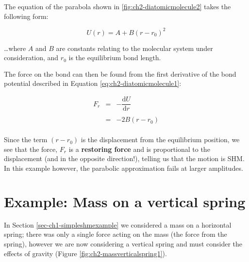 \documentclass[
]{book}
\begin{document}
The equation of the parabola shown in \ref{fig:ch2-diatomicmolecule2} takes the following form:

\begin{equation}
U(r) = A + B(r - r_0)^2
\label{eq:ch2-diatomicmolecule1}
\end{equation}

\ldots where \(A\) and \(B\) are constants relating to the molecular system under consideration, and \(r_0\) is the equilibrium bond length.

The force on the bond can then be found from the first derivative of the bond potential described in Equation \eqref{eq:ch2-diatomicmolecule1}:

\begin{equation}
\begin{array}{rcl}
F_r &=& - \dfrac{\mathrm{d}U}{\mathrm{d}r} \\
\\
&=& -2B(r-r_0)\\
\end{array}
\label{eq:ch2-diatomicmolecule2}
\end{equation}

Since the term \((r-r_0)\) is the displacement from the equilibrium position, we see that the force, \(F_r\) is a \textbf{restoring force} and is proportional to the displacement (and in the opposite direction!), telling us that the motion is SHM. In this example however, the parabolic approximation fails at larger amplitudes.

\hypertarget{sec-ch2-massverticalspring}{%
\section{Example: Mass on a vertical spring}\label{sec-ch2-massverticalspring}}

In Section \ref{sec-ch1-simpleshmexample} we considered a mass on a horizontal spring; there was only a single force acting on the mass (the force from the spring), however we are now considering a vertical spring and must consider the effects of gravity (Figure \ref{fig:ch2-massverticalspring1}).
\end{document}
